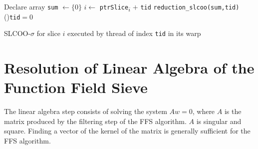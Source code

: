 \documentclass[runningheads,orivec]{llncs}
\begin{document}
\begin{algorithm}[H]
 \small 
 \BlankLine
 Declare array \texttt{sum} $\leftarrow \{0\}$
 $i\leftarrow$ \texttt{ptrSlice}\textsubscript{$i$} $+$ \texttt{tid}
   \texttt{reduction\_slcoo(sum,tid)}
  \If(){\texttt{\upshape tid}$=0$}{
  } 
 \caption{\small SLCOO-$\sigma$ for slice $i$ executed by thread of index \texttt{tid} in its warp}
\end{algorithm}


\section{Resolution of Linear Algebra of the Function Field Sieve}

\label{Appendix::Linear Algebra}
The linear algebra step consists of solving the system  $Aw=0$, where $A$ is the matrix produced by the filtering step of the FFS algorithm. $A$ is singular and square. Finding a vector of the kernel of the matrix is generally sufficient for the FFS algorithm. 
\end{document}
